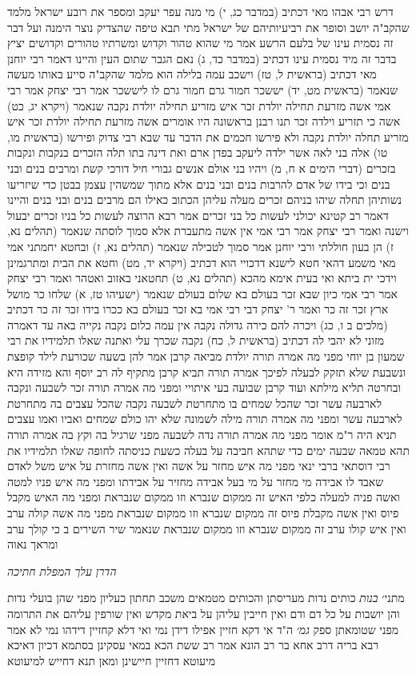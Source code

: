 \documentclass[12pt, openany]{book}
\begin{document}
{דרש רבי אבהו מאי דכתיב (במדבר כג, י) מי מנה עפר יעקב ומספר את רובע ישראל מלמד שהקב"ה יושב וסופר את רביעיותיהם של ישראל מתי תבא טיפה שהצדיק נוצר הימנה 
ועל דבר זה נסמית עינו של בלעם הרשע אמר מי שהוא טהור וקדוש ומשרתיו טהורים וקדושים יציץ בדבר זה מיד נסמית עינו דכתיב (במדבר כד, ג) נאם הגבר שתום העין 
והיינו דאמר רבי יוחנן מאי דכתיב (בראשית ל, טז) וישכב עמה בלילה הוא מלמד שהקב"ה סייע באותו מעשה שנאמר (בראשית מט, יד) יששכר חמור גרם חמור גרם לו ליששכר 
אמר רבי יצחק אמר רבי אמי אשה מזרעת תחילה יולדת זכר איש מזריע תחילה יולדת נקבה שנאמר (ויקרא יג, כט) אשה כי תזריע וילדה זכר 
תנו רבנן בראשונה היו אומרים אשה מזרעת תחילה יולדת זכר איש מזריע תחלה יולדת נקבה ולא פירשו חכמים את הדבר עד שבא רבי צדוק ופירשו (בראשית מו, טו) אלה בני לאה אשר ילדה ליעקב בפדן ארם ואת דינה בתו תלה הזכרים בנקבות ונקבות בזכרים 
(דברי הימים א ח, מ) ויהיו בני אולם אנשים גבורי חיל דורכי קשת ומרבים בנים ובני בנים וכי בידו של אדם להרבות בנים ובני בנים אלא מתוך
שמשהין עצמן בבטן כדי שיזריעו נשותיהן תחלה שיהו בניהם זכרים מעלה עליהן הכתוב כאילו הם מרבים בנים ובני בנים והיינו דאמר רב קטינא יכולני לעשות כל בני זכרים אמר רבא הרוצה לעשות כל בניו זכרים יבעול וישנה 
ואמר רבי יצחק אמר רבי אמי אין אשה מתעברת אלא סמוך לוסתה שנאמר (תהלים נא, ז) הן בעון חוללתי 
ורבי יוחנן אמר סמוך לטבילה שנאמר (תהלים נא, ז) ובחטא יחמתני אמי 
מאי משמע דהאי חטא לישנא דדכויי הוא דכתיב (ויקרא יד, מט) וחטא את הבית ומתרגמינן וידכי ית ביתא ואי בעית אימא מהכא (תהלים נא, ט) תחטאני באזוב ואטהר 
ואמר רבי יצחק אמר רבי אמי כיון שבא זכר בעולם בא שלום בעולם שנאמר (ישעיהו טז, א) שלחו כר מושל ארץ זכר זה כר 
ואמר ר' יצחק דבי רבי אמי בא זכר בעולם בא ככרו בידו זכר זה כר דכתיב (מלכים ב ו, כג) ויכרה להם כירה גדולה 
נקבה אין עמה כלום נקבה נקייה באה עד דאמרה מזוני לא יהבי לה דכתיב (בראשית ל, כח) נקבה שכרך עלי ואתנה 
שאלו תלמידיו את רבי שמעון בן יוחי מפני מה אמרה תורה יולדת מביאה קרבן אמר להן בשעה שכורעת לילד קופצת ונשבעת שלא תזקק לבעלה לפיכך אמרה תורה תביא קרבן 
מתקיף לה רב יוסף והא מזידה היא ובחרטה תליא מילתא ועוד קרבן שבועה בעי איתויי 
ומפני מה אמרה תורה זכר לשבעה ונקבה לארבעה עשר זכר שהכל שמחים בו מתחרטת לשבעה נקבה שהכל עצבים בה מתחרטת לארבעה עשר 
ומפני מה אמרה תורה מילה לשמונה שלא יהו כולם שמחים ואביו ואמו עצבים 
תניא היה ר"מ אומר מפני מה אמרה תורה נדה לשבעה מפני שרגיל בה וקץ בה אמרה תורה תהא טמאה שבעה ימים כדי שתהא חביבה על בעלה כשעת כניסתה לחופה 
שאלו תלמידיו את רבי דוסתאי ברבי ינאי מפני מה איש מחזר על אשה ואין אשה מחזרת על איש משל לאדם שאבד לו אבידה מי מחזר על מי בעל אבידה מחזיר על אבידתו 
ומפני מה איש פניו למטה ואשה פניה למעלה כלפי האיש זה ממקום שנברא וזו ממקום שנבראת 
ומפני מה האיש מקבל פיוס ואין אשה מקבלת פיוס זה ממקום שנברא וזו ממקום שנבראת 
מפני מה אשה קולה ערב ואין איש קולו ערב זה ממקום שנברא וזו ממקום שנבראת שנאמר {שיר השירים ב } כי קולך ערב ומראך נאוה
\par \par {\large\emph{הדרן עלך המפלת חתיכה}}\par \par 
מתני׳ {\large\emph{בנות}} כותים נדות מעריסתן והכותים מטמאים משכב תחתון כעליון מפני שהן בועלי נדות
והן יושבות על כל דם ודם 
ואין חייבין עליהן על ביאת מקדש ואין שורפין עליהם את התרומה מפני שטומאתן ספק 
{\large\emph{גמ׳}} ה"ד אי דקא חזיין אפילו דידן נמי ואי דלא קחזיין דידהו נמי לא
אמר רבא בריה דרב אחא בר רב הונא אמר רב ששת הכא במאי עסקינן בסתמא דכיון דאיכא מיעוטא דחזיין חיישינן ומאן תנא דחייש למיעוטא}
\end{document}
